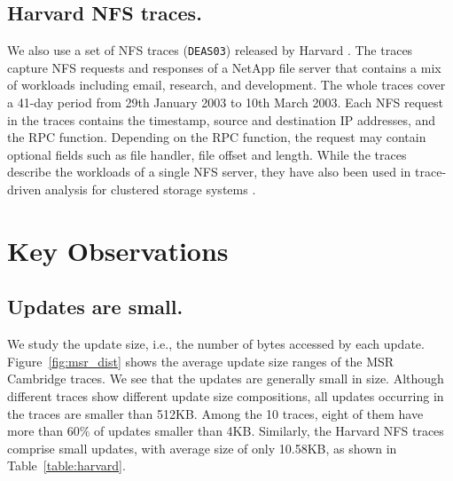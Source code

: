 
\subsection{Harvard NFS traces.}  We also use a set of NFS traces
(\texttt{DEAS03}) released by Harvard \cite{ellard04}.  The traces capture NFS
requests and responses of a NetApp file server 
that contains a mix of workloads including email, research, and development.
The whole traces cover a 41-day period from 29th January 2003 to 10th March
2003.  Each NFS request in the traces contains the timestamp, source and
destination IP addresses, and the RPC function. 
Depending on the RPC function, the request may contain optional fields such as
file handler, file offset and length.  While the traces describe the
workloads of a single NFS server, they have also been used in trace-driven
analysis for clustered storage systems \cite{abd05,hendricks06}.


\section{Key Observations}


\subsection{Updates are small.}  We study the update size, i.e., the number of
bytes accessed by each update.  Figure~\ref{fig:msr_dist} shows the average
update size ranges of the MSR Cambridge traces.  We see that the updates are
generally small in size. Although different traces show different
update size compositions, all updates occurring in the traces are smaller than
512KB. Among the 10 traces, eight of them have more than $60\%$ of updates
smaller than 4KB. Similarly, the Harvard NFS traces comprise small updates,
with average size of only 10.58KB, as shown in Table~\ref{table:harvard}.

